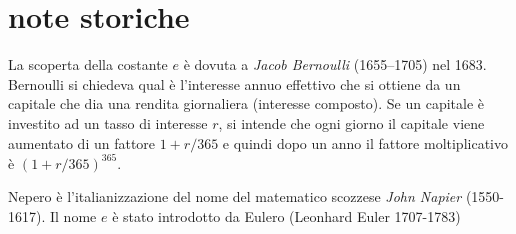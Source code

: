 \section{note storiche}

\label{note:Bernoulli}%
%
La scoperta della costante $e$
è dovuta a \emph{Jacob Bernoulli} (1655--1705) nel 1683.
Bernoulli si chiedeva qual è l'interesse annuo effettivo
che si ottiene da un capitale che dia una rendita
giornaliera (interesse composto).
Se un capitale è investito ad un tasso di interesse $r$,
si intende che ogni giorno il capitale
viene aumentato di un fattore $1+r/365$
e quindi dopo un anno il fattore moltiplicativo è $(1+r/365)^{365}$.

\label{nota:Nepero}%
%
%
\label{Euler!Leonhard}%
\label{Eulero}%
Nepero è l'italianizzazione del nome del
matematico scozzese \emph{John Napier} (1550-1617).
Il nome $e$ è stato introdotto da Eulero (Leonhard Euler 1707-1783)

